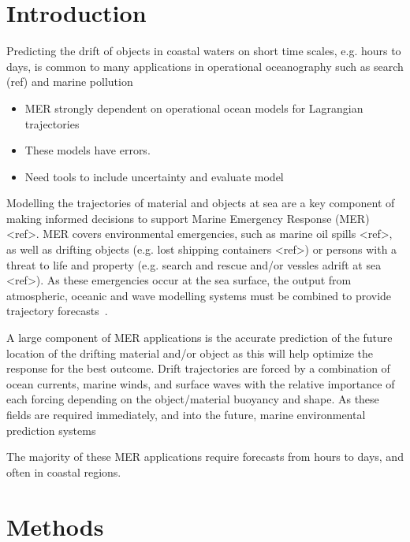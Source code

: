 \documentclass{article}
\begin{document}
\section{Introduction}
\label{sec:intro}

Predicting the drift of objects in coastal waters on short time scales, e.g. hours to days, is common to many applications in operational oceanography such as search (ref) and marine pollution 

\begin{itemize}
	\item MER strongly dependent on operational ocean models for Lagrangian trajectories
	\item These models have errors.
	\item Need tools to include uncertainty and evaluate model
\end{itemize}

Modelling the trajectories of material and objects at sea are a key component of making informed decisions to support Marine Emergency Response (MER) <ref>. MER covers environmental emergencies, such as marine oil spills <ref>, as well as drifting objects (e.g. lost shipping containers <ref>) or persons with a threat to life and property (e.g. search and rescue and/or vessles adrift at sea <ref>). As these emergencies occur at the sea surface, the output from atmospheric, oceanic and wave modelling systems must be combined to provide trajectory forecasts~\citep{Davidson_etal_2009}. 

A large component of MER applications is the accurate prediction of the future location of the drifting material and/or object as this will help optimize the response for the best outcome. Drift trajectories are forced by a combination of ocean currents, marine winds, and surface waves with the relative importance of each forcing depending on the object/material buoyancy and shape. As these fields are required immediately, and into the future, marine environmental prediction systems  

The majority of these MER applications require forecasts from hours to days, and often in coastal regions. 


\section{Methods}
\label{sec:meth}
\end{document}
